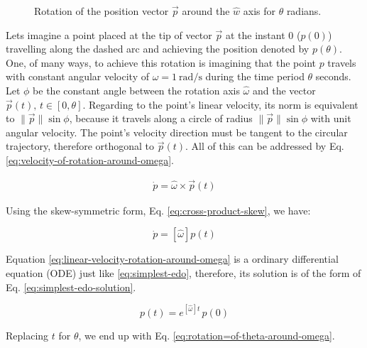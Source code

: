 \documentclass[12pt]{article}
\begin{document}
\begin{figure}[h]
\centering
    
    \caption{Rotation of the position vector $\vec{p}$ around the $\hat{w}$ axis for $\theta$ radians.}
    \label{fig:rodrigues-rotation}
\end{figure}

Lets imagine a point placed at the tip of vector $\vec{p}$ at the instant $0$ ($p(0)$) travelling along the dashed arc and achieving the position denoted by $p(\theta)$. One, of many ways, to achieve this rotation is imagining that the point $p$ travels with constant angular velocity of $\omega = \SI[per-mode=symbol]{1}{\radian \per \second}$ during the time period $\theta$ seconds. Let $\phi$ be the constant angle between the rotation axis $\hat{\omega}$ and the vector $\vec{p}(t)\text{, } t \in [0, \theta]$. Regarding to the point's linear velocity, its norm is equivalent to $\lVert \vec{p} \rVert \sin{\phi}$, because it travels along a circle of radius $\lVert \vec{p} \rVert \sin{\phi}$ with unit angular velocity. The point's velocity direction must be tangent to the circular trajectory, therefore orthogonal to $\vec{p}(t)$. All of this can be addressed by Eq. \ref{eq:velocity-of-rotation-around-omega}.

\begin{equation} \begin{aligned}
    \dot{p} = \hat{\omega} \times \vec{p}(t)
    \end{aligned}
    \label{eq:velocity-of-rotation-around-omega}
\end{equation}

Using the skew-symmetric form, Eq. \ref{eq:cross-product-skew}, we have:

\begin{equation}
    \dot{p} = \left[ \hat{\omega} \right] p(t)
    \label{eq:linear-velocity-rotation-around-omega}
\end{equation}

Equation \ref{eq:linear-velocity-rotation-around-omega} is a ordinary differential equation (ODE) just like \ref{eq:simplest-edo}, therefore, its solution is of the form of Eq. \ref{eq:simplest-edo-solution}.

\begin{equation*}
    p(t) = e^{\left[ \hat{\omega} \right] t} \, p(0)
\end{equation*}

Replacing $t$ for $\theta$, we end up with Eq. \ref{eq:rotation=of-theta-around-omega}.
\end{document}
